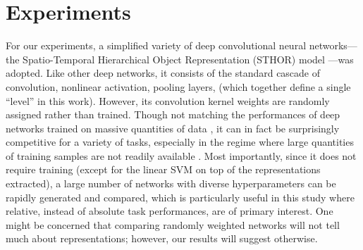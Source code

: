 \documentclass[10pt,twocolumn,letterpaper]{article}
\begin{document}
\section{Experiments}
\label{sec:exp}

For our experiments, a simplified variety of deep convolutional neural networks---the Spatio-Temporal Hierarchical Object Representation (STHOR) model \cite{pinto2009high, sthor}---{was} adopted.
Like other deep networks, it consists of the standard cascade of convolution, nonlinear activation, pooling layers, \etc (which together define a single ``level'' in this work). However, its convolution kernel weights are  randomly assigned rather than trained.
Though not matching the performances of deep networks trained on massive quantities of data \cite{krizhevsky2012imagenet}, it can in fact be surprisingly competitive for a variety of tasks, especially in the regime where large quantities of training samples are not readily available \cite{pinto2009high, cox2011beyond, viglarge}.
Most importantly, since it does not require training (except for the linear SVM on top of the representations extracted), a large number of networks with diverse hyperparameters can be rapidly generated and compared, which is particularly useful in this study where relative, instead of absolute task performances, are of primary interest. 
One might be concerned that comparing randomly weighted networks will not tell much about representations; however, our results will suggest otherwise.


\newcommand{\expsettings}{\Ie 32 channels of filters in the top level's convolution layers, a simple setting with reasonable performance.
Following the terminology in recent work, shallow and deep neurons corresponded to \texttt{pool1} and \texttt{pool2} layers respectively.
Stimulus dimensionalities of the shallow and deep neurons {were} $N=121$ and $441$ (\ie spatially overlapping $11\times11$ and $21\times21$ receptive fields). %
Other minor changes included: nonlinear activations all simplified to \emph{ReLU} \cite{krizhevsky2012imagenet} mode and normalizations all in subtractive mode.
Overall, the architectures were more similar to those in \cite{simonyan2014very}, except pooling operations can be \emph{average}, \emph{squared}, or \emph{max-like} in our case.
}
\end{document}
